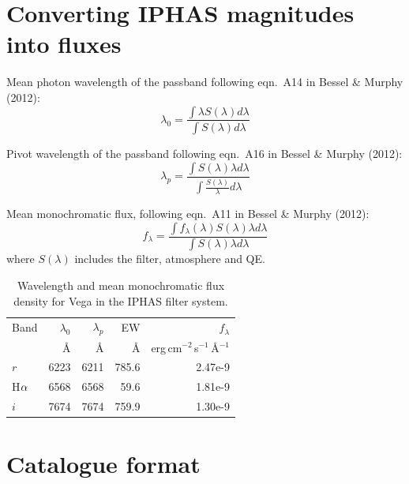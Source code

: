 \documentclass[useAMS,usenatbib]{mn2e}
\def\ha{\mbox{H$\rm \alpha$}}
\begin{document}
\label{lastpage}




\newpage
\appendix


\section{Converting IPHAS magnitudes into fluxes}

Mean photon wavelength of the passband following eqn.~A14 in Bessel \& Murphy (2012):
\begin{equation}
\lambda_0 = \frac{\int{\lambda S(\lambda) d \lambda}}
{\int{S(\lambda)d\lambda}}
\end{equation}

Pivot wavelength of the passband following eqn.~A16 in Bessel \& Murphy (2012):
\begin{equation}
\lambda_p = \frac{\int{S(\lambda) \lambda d \lambda}}
{\int{\frac{S(\lambda)}{\lambda} d\lambda}}
\end{equation}

Mean monochromatic flux,
following eqn.~A11 in Bessel \& Murphy (2012):
\begin{equation}
f_\lambda = \frac{\int{f_\lambda(\lambda) S(\lambda) \lambda d \lambda}}
{\int{S(\lambda)\lambda d \lambda}}
\end{equation}
where $S(\lambda)$ includes the filter, atmosphere and QE.

\begin{table}[h]
    \caption{Wavelength and mean monochromatic flux density for Vega in the IPHAS filter system.}
    \label{tbl:flux}
    \begin{tabular}{lrrrr}
    \toprule
     Band & $\lambda_0$ & $\lambda_p$ & EW  & $f_\lambda$   \\
     & \AA & \AA & \AA & erg\,cm$^{-2}$\,s$^{-1}$\,\AA$^{-1}$  \\
    \midrule
$r$ &  6223  &   6211  &  785.6  &  2.47e-9  \\
\ha &  6568  &   6568  &   59.6  &  1.81e-9  \\
$i$ &  7674  &   7674  &  759.9  &  1.30e-9   \\
    \bottomrule
    \end{tabular}
\end{table}


\newpage
\onecolumn
\section{Catalogue format}
\label{app:columns}
\end{document}
